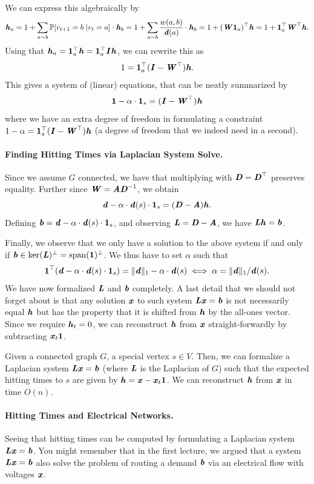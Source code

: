 We can express this algebraically by
\[
\hh_a = 1 + \sum_{a \sim b} \mathbb{P}[v_{t+1} = b \;| v_t = a]  \cdot \hh_b = 1 + \sum_{a \sim b} \frac{w(a,b)}{\dd(a)}  \cdot \hh_b =  1 + (\WW\vecone_a)^{\trp} \hh = 1 + \vecone_a^{\trp} \WW^{\trp} \hh.
\]
Using that $\hh_a = \vecone_a^{\trp} \hh =  \vecone_a^{\trp} \II \hh$, we can rewrite this as 
\[
1 = \vecone_a^\trp (\II - \WW^\trp) \hh.
\]
This gives a system of (linear) equations, that can be neatly summarized by 
\[
\vecone - \alpha \cdot \vecone_s = (\II - \WW^\trp) \hh
\]
where we have an extra degree of freedom in formulating a constraint $1 - \alpha = \vecone_s^\trp (\II -\WW^\trp) \hh$ (a degree of freedom that we indeed need in a second).

\paragraph{Finding Hitting Times via Laplacian System Solve.} Since we assume $G$ connected, we have that multiplying with $\DD = \DD^\trp$ preserves equality. Further since $\WW = \AA \DD^{-1}$, we obtain
\[
\dd - \alpha \cdot \dd(s) \cdot \vecone_s = (\DD - \AA) \hh.
\]
Defining $\bb = \dd - \alpha \cdot \dd(s) \cdot \vecone_s$, and observing $\LL = \DD - \AA$, we have $\LL\hh = \bb$. 

Finally, we observe that we only have a solution to the above system if and only if $\bb \in \ker(\LL)^\perp =  \Span(\vecone)^\perp$. We thus have to set $\alpha$ such that 
\[
\vecone^{\trp}(\dd - \alpha \cdot \dd(s) \cdot \vecone_s) = \|\dd\|_1 - \alpha \cdot \dd(s) \iff \alpha =  \|\dd\|_1 /\dd(s).
\]
We have now formalized $\LL$ and $\bb$ completely. A last detail that we should not forget about is that any solution $\xx$ to such system $\LL \xx = \bb$ is not necessarily equal $\hh$ but has the property that it is shifted from $\hh$ by the all-ones vector. Since we require $\hh_t = 0$, we can reconstruct $\hh$ from $\xx$ straight-forwardly by subtracting $\xx_t \vecone$.

\begin{theorem}
	Given a connected graph $G$, a special vertex $s \in V$. Then, we can formalize a Laplacian system $\LL \xx = \bb$ (where $\LL$ is the Laplacian of $G$) such that the expected hitting times to $s$ are given by $\hh = \xx - \xx_t \vecone$. We can reconstruct $\hh$ from $\xx$ in time $O(n)$.
\end{theorem}

\paragraph{Hitting Times and Electrical Networks.} Seeing that hitting times can be computed by formulating a Laplacian system $\LL \xx = \bb$. You might remember that in the first lecture, we argued that a system $\LL \xx = \bb$ also solve the problem of routing a demand $\bb$ via an electrical flow with voltages $\xx$. 

